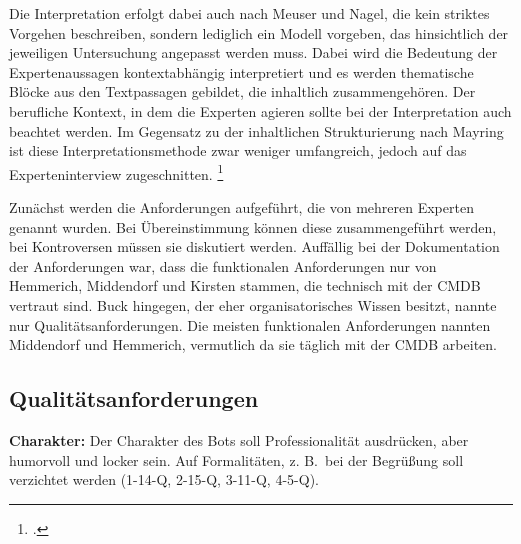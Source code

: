 Die Interpretation erfolgt dabei auch nach Meuser und Nagel, die kein striktes Vorgehen beschreiben, sondern lediglich ein Modell vorgeben, das hinsichtlich der jeweiligen Untersuchung angepasst werden muss.
Dabei wird die Bedeutung der Expertenaussagen kontextabhängig interpretiert und es werden thematische Blöcke aus den Textpassagen gebildet, die inhaltlich zusammengehören.
Der berufliche Kontext, in dem die Experten agieren sollte bei der Interpretation auch beachtet werden.
Im Gegensatz zu der inhaltlichen Strukturierung nach Mayring ist diese Interpretationsmethode zwar weniger umfangreich, jedoch auf das Experteninterview zugeschnitten.
\footcites[Vgl.][452\psq]{Meuser_1991_Interview}[Vgl.][103\psq]{Mayring_2015_qualitative_Inhaltsanalyse}

Zunächst werden die Anforderungen aufgeführt, die von mehreren Experten genannt wurden. Bei Übereinstimmung können diese zusammengeführt werden, bei Kontroversen müssen sie diskutiert werden. Auffällig bei der Dokumentation der Anforderungen war, dass die funktionalen Anforderungen nur von Hemmerich, Middendorf und Kirsten stammen, die technisch mit der \acs{CMDB} vertraut sind. Buck hingegen, der eher organisatorisches Wissen besitzt, nannte nur Qualitätsanforderungen. Die meisten funktionalen Anforderungen nannten Middendorf und Hemmerich, vermutlich da sie täglich mit der \acs{CMDB} arbeiten.


\newpage
\subsection{Qualitätsanforderungen}

\textbf{Charakter:} Der Charakter des Bots soll Professionalität ausdrücken, aber humorvoll und locker sein. Auf Formalitäten, z. B.~bei der Begrüßung soll verzichtet werden (1-14-Q, 2-15-Q, 3-11-Q, 4-5-Q).

